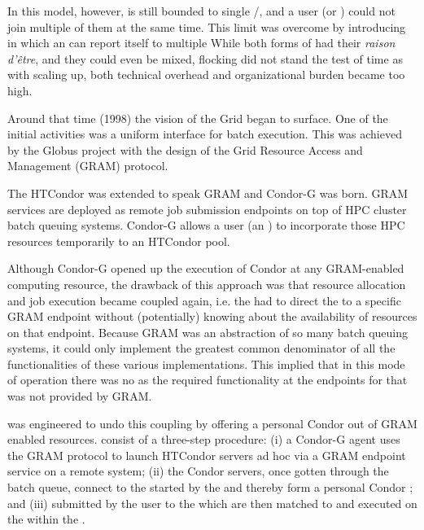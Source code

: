 \documentclass{sig-alternate}
\begin{document}

In this model, however,  is still bounded to single
/, and a user (or )
could not join multiple of them at the same time.
%
%
This limit was overcome by introducing  in which an
 can report itself to multiple 
While both forms of  had their \textit{raison d'\^{e}tre},
and they could even be mixed,  flocking did not stand the test
of time as with scaling up, both technical overhead and organizational burden
became too high.

%
%
Around that time (1998) the vision of the Grid began to surface. One of the
initial activities was a uniform interface for batch execution. This was
achieved by the Globus project with the design of the Grid Resource Access and
Management (GRAM) protocol.

The HTCondor  was extended to speak GRAM and Condor-G
\cite{condor-g} was born. GRAM services are deployed as remote job submission
endpoints on top of HPC cluster batch queuing systems. Condor-G allows a user
(an ) to incorporate those HPC resources temporarily to an
HTCondor pool.

Although Condor-G opened up the execution of Condor  at any
GRAM-enabled computing resource, the drawback of this approach was that
resource allocation and job execution became coupled again, i.e. the
 had to direct the  to a specific GRAM endpoint
without (potentially) knowing about the availability of resources on that
endpoint. Because GRAM was an abstraction of so many batch queuing systems, it
could only implement the greatest common denominator of all the functionalities
of these various implementations. This implied that in this mode of operation
there was no  as the required functionality at the
endpoints for that was not provided by GRAM.

%
%
 was engineered to undo this coupling by offering a
personal Condor  out of GRAM enabled resources.  consist of a three-step procedure: (i) a Condor-G agent uses the GRAM
protocol to launch HTCondor servers ad hoc via a GRAM endpoint service on a
remote system; (ii) the Condor servers, once gotten through the batch queue,
connect to the  started by the  and thereby
form a personal Condor ; and (iii)  submitted by
the user to the  which are then matched to and executed on the
 within the .
\end{document}
